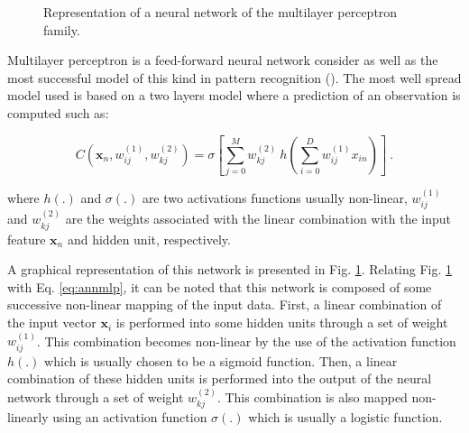 \begin{enumerate}[leftmargin=*]
\begin{figure}
\caption{Representation of a neural network of the multilayer perceptron family.}
\label{fig:mlp}
\end{figure}

Multilayer perceptron is a feed-forward neural network consider as well as the most successful model of this kind in pattern recognition (\cite{Bishop2006}). The most well spread model used is based on a two layers model where a prediction of an observation is computed such as:

\begin{equation}
	C(\mathbf{x}_n,w_{ij}^{(1)},w_{kj}^{(2)}) = \sigma \left[ \sum_{j=0}^{M} w_{kj}^{(2)} \  h \left( \sum_{i=0}^{D} w_{ij}^{(1)} x_{in} \right) \right] \ .
	\label{eq:annmlp}
\end{equation}

\noindent where $h(.)$ and $\sigma(.)$ are two activations functions usually non-linear, $w_{ij}^{(1)}$ and $ w_{kj}^{(2)}$ are the weights associated with the linear combination with the input feature $\mathbf{x}_n$ and hidden unit, respectively.

A graphical representation of this network is presented in Fig. \ref{fig:mlp}. Relating Fig. \ref{fig:mlp} with Eq. \ref{eq:annmlp}, it can be noted that this network is composed of some successive non-linear mapping of the input data. First, a linear combination of the input vector $\mathbf{x}_i$ is performed into some hidden units through a set of weight $w_{ij}^{(1)}$. This combination becomes non-linear by the use of the activation function $h(.)$ which is usually chosen to be a sigmoid function. Then, a linear combination of these hidden units is performed into the output of the neural network through a set of weight $w_{kj}^{(2)}$. This combination is also mapped non-linearly using an activation function $\sigma(.)$ which is usually a logistic function.


\end{enumerate}
